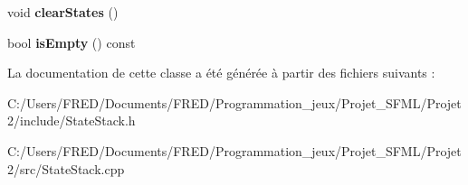 \begin{DoxyCompactItemize}
\item 
void {\bfseries clear\+States} ()\hypertarget{class_state_stack_a49f0703d4037c3bf63494e64cb09898d}{}\label{class_state_stack_a49f0703d4037c3bf63494e64cb09898d}

\item 
bool {\bfseries is\+Empty} () const \hypertarget{class_state_stack_a63a73898d24eb0a68cac0215a9fda4fc}{}\label{class_state_stack_a63a73898d24eb0a68cac0215a9fda4fc}

\end{DoxyCompactItemize}


La documentation de cette classe a été générée à partir des fichiers suivants \+:\begin{DoxyCompactItemize}
\item 
C\+:/\+Users/\+F\+R\+E\+D/\+Documents/\+F\+R\+E\+D/\+Programmation\+\_\+jeux/\+Projet\+\_\+\+S\+F\+M\+L/\+Projet2/include/State\+Stack.\+h\item 
C\+:/\+Users/\+F\+R\+E\+D/\+Documents/\+F\+R\+E\+D/\+Programmation\+\_\+jeux/\+Projet\+\_\+\+S\+F\+M\+L/\+Projet2/src/State\+Stack.\+cpp\end{DoxyCompactItemize}
